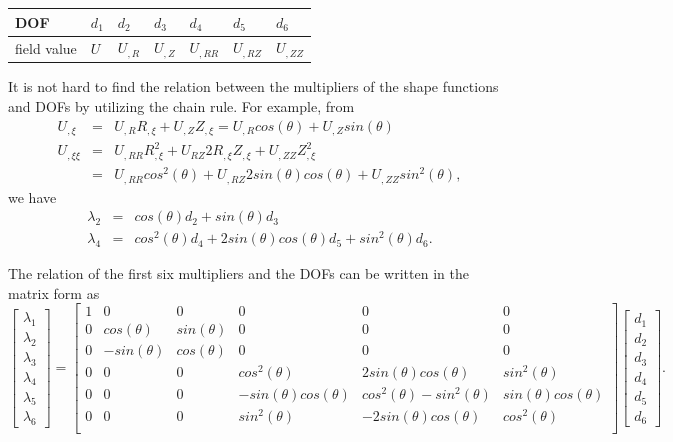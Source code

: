 \documentclass[11pt]{article}  %
\begin{document}
\begin{center}
 \begin{tabular}{ |l|l|l|l|l|l|l|}
\hline
 DOF& $d_1$ & $d_2$ & $d_3$ & $d_4$ & $d_5$ &$d_6$  \\ \hline
 field value & $U$ & $U_{,R}$ & $U_{,Z}$ & $U_{,RR}$ & $U_{,RZ}$ &$U_{,ZZ}$  \\ \hline
\end{tabular}
\end{center}
It is not hard to find the relation between the multipliers of the shape functions and DOFs by utilizing the chain rule. For example,  from
\begin{eqnarray}
U_{,\xi}&=&U_{,R}R_{,\xi}+U_{,Z}Z_{,\xi}=U_{,R}cos(\theta)+U_{,Z}sin(\theta) \\
U_{,\xi\xi}&=&U_{,RR}R_{,\xi}^2+ U_{RZ}2R_{,\xi}Z_{,\xi}+U_{,ZZ}Z_{,\xi}^2 \\ \nonumber
               &=&U_{,RR}cos^2(\theta)+U_{,RZ}2sin(\theta)cos(\theta)+U_{,ZZ}sin^2(\theta),
\end{eqnarray}
we have
\begin{eqnarray}
\lambda_2 &=& cos(\theta)d_2+sin(\theta)d_3 \\
\lambda_4&=&cos^2(\theta)d_4+2sin(\theta)cos(\theta)d_5+sin^2(\theta)d_6.
\end{eqnarray}

The relation of the first six multipliers and the DOFs can be written in the matrix form as
\begin{equation} 
\left[
 \begin{array}{c}
 \lambda_{1} \\
 \lambda_{2} \\
 \lambda_{3} \\
 \lambda_{4}\\
 \lambda_{5}\\
 \lambda_{6}
 \end{array} \right]=\left[
 \begin{array}{cccccc}
 1 & 0 & 0 & 0 & 0 & 0 \\
 0 & cos(\theta) & sin(\theta) & 0 & 0 &0 \\
 0 & -sin(\theta) & cos(\theta) & 0 & 0 &0 \\
 0 & 0 & 0 & cos^2(\theta) & 2sin(\theta)cos(\theta) & sin^2(\theta) \\
 0 & 0 & 0 & -sin(\theta)cos(\theta) & cos^2(\theta)-sin^2(\theta) & sin(\theta)cos(\theta) \\
 0 & 0 & 0 & sin^2(\theta) & -2sin(\theta)cos(\theta) & cos^2(\theta) \\ 
 \end{array}
 \right]  \left[
 \begin{array}{c}
 d_{1} \\
 d_{2} \\
 d_{3} \\
 d_{4}\\
 d_{5}\\
 d_{6}
 \end{array} \right].
\end{equation}
\end{document}
